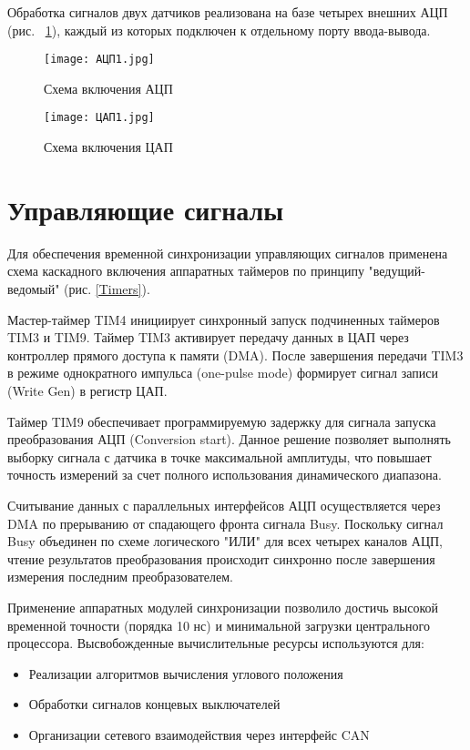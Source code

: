 Обработка сигналов двух датчиков реализована на базе четырех внешних АЦП (рис. ~\ref{ADC}), каждый из которых подключен к отдельному порту ввода-вывода.

\begin{figure}[!h]
  \centering
  \texttt{[image: АЦП1.jpg]} 
  \caption{Схема включения АЦП}
  \label{ADC}
\end{figure}

\begin{figure}[!h]
  \centering
  \texttt{[image: ЦАП1.jpg]} 
  \caption{Схема включения ЦАП}
  \label{DAC}
\end{figure}

\FloatBarrier

\section{Управляющие сигналы}
Для обеспечения временной синхронизации управляющих сигналов применена схема каскадного включения аппаратных таймеров по принципу 
"ведущий-ведомый" (рис. \ref{Timers}). 

Мастер-таймер TIM4 инициирует синхронный запуск подчиненных таймеров TIM3 и TIM9. 
Таймер TIM3 активирует передачу данных в ЦАП через контроллер прямого доступа к памяти (DMA). 
После завершения передачи TIM3 в режиме однократного импульса (one-pulse mode) формирует сигнал записи (Write Gen) в регистр ЦАП. 

Таймер TIM9 обеспечивает программируемую задержку для сигнала запуска преобразования АЦП (Conversion start). 
Данное решение позволяет выполнять выборку сигнала с датчика в точке максимальной амплитуды, что повышает точность измерений за счет полного 
использования динамического диапазона.

Считывание данных с параллельных интерфейсов АЦП осуществляется через DMA по прерыванию от спадающего фронта сигнала Busy. 
Поскольку сигнал Busy объединен по схеме логического "ИЛИ"  для всех четырех каналов АЦП, чтение результатов преобразования происходит 
синхронно после завершения измерения последним преобразователем.

Применение аппаратных модулей синхронизации позволило достичь высокой временной точности (порядка 10 нс) и минимальной загрузки центрального процессора. 
Высвобожденные вычислительные ресурсы используются для:
\begin{itemize}
    \item Реализации алгоритмов вычисления углового положения
    \item Обработки сигналов концевых выключателей
    \item Организации сетевого взаимодействия через интерфейс CAN
\end{itemize}

